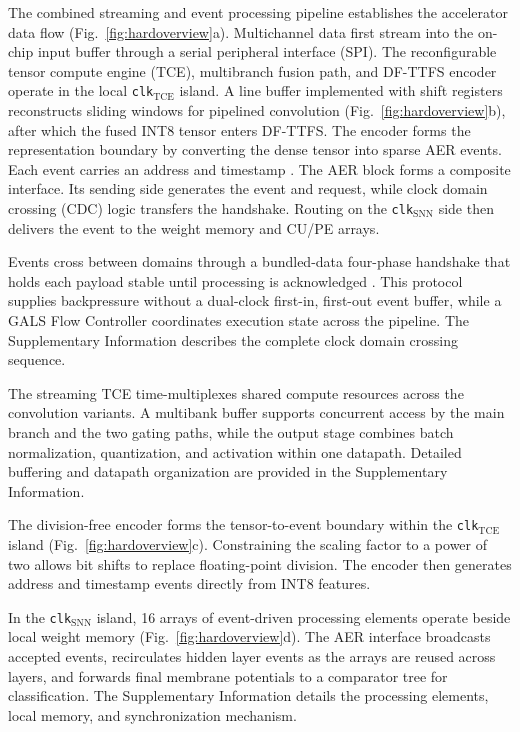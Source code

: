 \documentclass{nsr}
\begin{document}
The combined streaming and event processing pipeline establishes the accelerator data flow (Fig.~\ref{fig:hardoverview}a). Multichannel data first stream into the on-chip input buffer through a serial peripheral interface (SPI). The reconfigurable tensor compute engine (TCE), multibranch fusion path, and DF-TTFS encoder operate in the local \texttt{clk}$_{\mathrm{TCE}}$ island. A line buffer implemented with shift registers reconstructs sliding windows for pipelined convolution (Fig.~\ref{fig:hardoverview}b), after which the fused INT8 tensor enters DF-TTFS. The encoder forms the representation boundary by converting the dense tensor into sparse AER events. Each event carries an address and timestamp \cite{AER}. The AER block forms a composite interface. Its sending side generates the event and request, while clock domain crossing (CDC) logic transfers the handshake. Routing on the \texttt{clk}$_{\mathrm{SNN}}$ side then delivers the event to the weight memory and CU/PE arrays.

Events cross between domains through a bundled-data four-phase handshake that holds each payload stable until processing is acknowledged \cite{ref72}. This protocol supplies backpressure without a dual-clock first-in, first-out event buffer, while a GALS Flow Controller coordinates execution state across the pipeline. The Supplementary Information describes the complete clock domain crossing sequence.

The streaming TCE time-multiplexes shared compute resources across the convolution variants. A multibank buffer supports concurrent access by the main branch and the two gating paths, while the output stage combines batch normalization, quantization, and activation within one datapath. Detailed buffering and datapath organization are provided in the Supplementary Information.

The division-free encoder forms the tensor-to-event boundary within the \texttt{clk}$_{\mathrm{TCE}}$ island (Fig.~\ref{fig:hardoverview}c). Constraining the scaling factor to a power of two allows bit shifts to replace floating-point division. The encoder then generates address and timestamp events directly from INT8 features.


In the \texttt{clk}$_{\mathrm{SNN}}$ island, 16 arrays of event-driven processing elements operate beside local weight memory (Fig.~\ref{fig:hardoverview}d). The AER interface broadcasts accepted events, recirculates hidden layer events as the arrays are reused across layers, and forwards final membrane potentials to a comparator tree for classification. The Supplementary Information details the processing elements, local memory, and synchronization mechanism.
\end{document}
